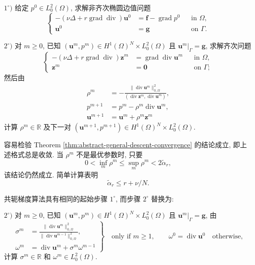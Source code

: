 $1^\circ)$ 给定 $p^0\in L_0^2(\Omega)$, 求解非齐次椭圆边值问题
\[
\left\{
\begin{aligned}
-(\nu\Delta+r\operatorname{grad}\operatorname{div})
\mathbf{u}^0
&=\mathbf{f}-\operatorname{grad}p^0
&&\text{in }\Omega,\\
\mathbf{u}^0&=\mathbf{g}
&&\text{on }\Gamma.
\end{aligned}
\right.
\]

$2^\circ)$ 对 $m\ge0$, 已知
$(\mathbf{u}^m,p^m)
\in H^1(\Omega)^N\times L_0^2(\Omega)$ 且
$\mathbf{u}^m|_\Gamma=\mathbf{g}$, 求解齐次问题
\[
\left\{
\begin{aligned}
-(\nu\Delta+r\operatorname{grad}\operatorname{div})
\mathbf{z}^m
&=\operatorname{grad}\operatorname{div}\mathbf{u}^m
&&\text{in }\Omega,\\
\mathbf{z}^m&=\mathbf{0}
&&\text{on }\Gamma;
\end{aligned}
\right.
\]
然后由
\[
\begin{aligned}
\rho^m
&=-\frac{\|\operatorname{div}\mathbf{u}^m\|_{0,\Omega}^2}
{(\operatorname{div}\mathbf{z}^m,
\operatorname{div}\mathbf{u}^m)},\\
p^{m+1}
&=p^m-\rho^m\operatorname{div}\mathbf{u}^m,\\
\mathbf{u}^{m+1}
&=\mathbf{u}^m+\rho^m\mathbf{z}^m
\end{aligned}
\]
计算 $\rho^m\in\mathbb{R}$ 及下一对
$(\mathbf{u}^{m+1},p^{m+1})
\in H^1(\Omega)^N\times L_0^2(\Omega)$.

容易检验 Theorem \ref{thm:abstract-general-descent-convergence}
的结论成立, 即上述格式总是收敛.
当 $\rho^m$ 不是最优参数时, 只要
\[
0<\inf_m\rho^m\le\sup_m\rho^m<2\widetilde{\alpha}_r,
\]
该结论仍然成立. 简单计算表明
\[
\widetilde{\alpha}_r\le r+\nu/N.
\]

共轭梯度算法具有相同的起始步骤 $1^\circ$, 而步骤
$2^\circ$ 替换为:

$2^\circ)$ 对 $m\ge0$, 已知
$(\mathbf{u}^m,p^m)\in H^1(\Omega)^N\times L_0^2(\Omega)$ 且
$\mathbf{u}^m|_\Gamma=\mathbf{g}$, 由
\[
\left.
\begin{aligned}
\sigma^m
&=\frac{\|\operatorname{div}\mathbf{u}^m\|_{0,\Omega}^2}
{\|\operatorname{div}\mathbf{u}^{m-1}\|_{0,\Omega}^2},\\
\omega^m
&=\operatorname{div}\mathbf{u}^m+\sigma^m\omega^{m-1}
\end{aligned}
\right\}
\quad\text{only if }m\ge1,
\qquad
\omega^0=\operatorname{div}\mathbf{u}^0\quad\text{otherwise},
\]
计算 $\sigma^m\in\mathbb{R}$ 和
$\omega^m\in L_0^2(\Omega)$.
